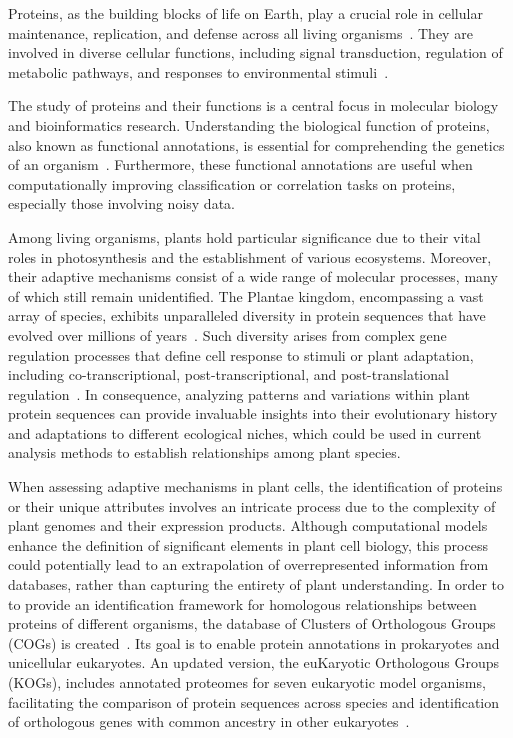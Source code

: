 Proteins, as the building blocks of life on Earth, play a 
crucial role in cellular maintenance, replication, and defense 
across all living organisms~\citep{kaur2022}. They are involved 
in diverse cellular functions, including signal transduction, 
regulation of metabolic pathways, and responses to environmental 
stimuli~\citep{zhang2010}.

The study of proteins and their functions is a central focus in 
molecular biology and bioinformatics research. Understanding the 
biological function of proteins, also known as functional 
annotations, is essential for comprehending 
the genetics of an organism~\citep{silva2020}. Furthermore, these 
functional annotations are useful when computationally improving 
classification or correlation tasks on proteins, especially those 
involving noisy data. 

Among living 
organisms, plants hold particular significance due to their 
vital roles in photosynthesis and the establishment of various 
ecosystems. Moreover, their adaptive mechanisms consist of a 
wide range of molecular processes, many of which still remain 
unidentified. The Plantae kingdom, encompassing a vast array of 
species, exhibits unparalleled diversity in protein sequences 
that have evolved over millions of years~\citep{chaudhary2019}. 
Such diversity arises from complex gene regulation processes 
that define cell response to stimuli or plant adaptation, 
including co-transcriptional, post-transcriptional, and 
post-translational regulation~\citep{skelly2016}. In 
consequence, analyzing 
patterns and variations within plant protein sequences can 
provide invaluable insights into their evolutionary history 
and adaptations to different ecological niches, which could be 
used in current analysis methods to establish 
relationships among plant species.

When assessing adaptive mechanisms in plant cells, the 
identification of proteins or their unique attributes
involves an intricate process due to the complexity of plant 
genomes and their expression products. Although 
computational models enhance the definition of significant elements 
in plant cell biology, this process could potentially lead to an 
extrapolation of overrepresented information from databases, rather 
than capturing the entirety of plant understanding. In order to 
to provide an identification framework for homologous relationships 
between proteins of different organisms, the database of 
Clusters of Orthologous Groups (COGs) is
created~\citep{tatusov1997,tatusov2001}. Its goal is to enable 
protein annotations in prokaryotes and unicellular 
eukaryotes. An updated version, 
the euKaryotic Orthologous Groups (KOGs), includes annotated 
proteomes for seven eukaryotic model organisms, facilitating 
the comparison of protein sequences across species and 
identification of orthologous genes with common ancestry in 
other eukaryotes~\citep{tatusov2003,yang2023,wangC2023,wangT2023}.


